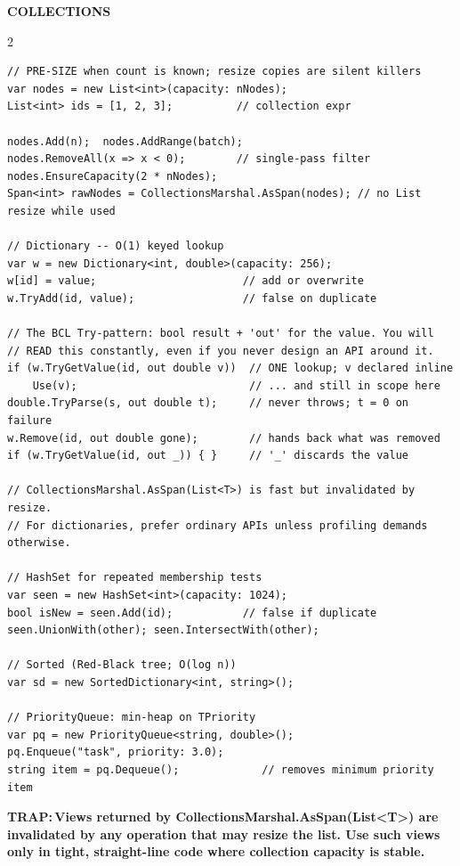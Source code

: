 \documentclass[9pt,a4paper]{extarticle}
\newenvironment{card}[3][acBlue]{%
  \begin{tcolorbox}[
    enhanced, colback=#2, colframe=bdCard,
    coltitle=black, colbacktitle=#2!70!bgHdr,
    fonttitle=\bfseries\fontsize{6.16pt}{7.48pt}\selectfont\MakeUppercase,
    title={#3},
    left=3pt, right=2pt, top=1.4pt, bottom=1.8pt,
    toptitle=1pt, bottomtitle=1pt,
    boxrule=0.4pt,
    borderline west={3pt}{0pt}{#1},
    arc=2pt, before skip=0pt, after skip=1.6mm,
    breakable, toprule at break=0pt, bottomrule at break=0pt,
  ]}{\end{tcolorbox}}
\newcommand{\sectionbanner}[1]{%
  \vspace{0.4mm}%
  {\setlength{\fboxsep}{1.5pt}%
   \colorbox{secBg}{\color{white}\bfseries\fontsize{6.6pt}{7.9pt}\selectfont
   \MakeUppercase{\hspace{0.5mm}#1\hspace{0.5mm}}}%
  }\vspace{1.3mm}\par\nobreak}
\newcommand{\code}[1]{{\ttfamily\bfseries #1}}
\newcommand{\trap}[1]{\par\noindent
  \begin{minipage}{\linewidth}%
  {\fontsize{5.6pt}{6.8pt}\selectfont\color{trap}\bfseries TRAP:\,#1}%
  \end{minipage}\par}
\begin{document}
\sectionbanner{Collections}
\begin{multicols}{2}

\begin{card}[acBlue]{bgBlue}{List, Dictionary, HashSet}
\begin{lstlisting}[style=cs]
// PRE-SIZE when count is known; resize copies are silent killers
var nodes = new List<int>(capacity: nNodes);
List<int> ids = [1, 2, 3];          // collection expr

nodes.Add(n);  nodes.AddRange(batch);
nodes.RemoveAll(x => x < 0);        // single-pass filter
nodes.EnsureCapacity(2 * nNodes);
Span<int> rawNodes = CollectionsMarshal.AsSpan(nodes); // no List resize while used

// Dictionary -- O(1) keyed lookup
var w = new Dictionary<int, double>(capacity: 256);
w[id] = value;                       // add or overwrite
w.TryAdd(id, value);                 // false on duplicate

// The BCL Try-pattern: bool result + 'out' for the value. You will
// READ this constantly, even if you never design an API around it.
if (w.TryGetValue(id, out double v))  // ONE lookup; v declared inline
    Use(v);                           // ... and still in scope here
double.TryParse(s, out double t);     // never throws; t = 0 on failure
w.Remove(id, out double gone);        // hands back what was removed
if (w.TryGetValue(id, out _)) { }     // '_' discards the value

// CollectionsMarshal.AsSpan(List<T>) is fast but invalidated by resize.
// For dictionaries, prefer ordinary APIs unless profiling demands otherwise.

// HashSet for repeated membership tests
var seen = new HashSet<int>(capacity: 1024);
bool isNew = seen.Add(id);           // false if duplicate
seen.UnionWith(other); seen.IntersectWith(other);

// Sorted (Red-Black tree; O(log n))
var sd = new SortedDictionary<int, string>();

// PriorityQueue: min-heap on TPriority
var pq = new PriorityQueue<string, double>();
pq.Enqueue("task", priority: 3.0);
string item = pq.Dequeue();             // removes minimum priority item
\end{lstlisting}
\trap{Views returned by \code{CollectionsMarshal.AsSpan(List<T>)} are invalidated
by any operation that may resize the list. Use such views only in tight,
straight-line code where collection capacity is stable.}
\end{card}


\end{multicols}
\end{document}
